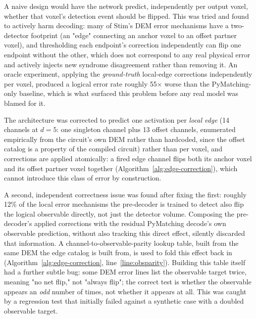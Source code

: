 \documentclass[conference]{IEEEtran}
\begin{document}
A naive design would have the network predict, independently per output voxel, whether that voxel's detection event should be flipped. This was tried and found to actively harm decoding: many of Stim's DEM error mechanisms have a two-detector footprint (an "edge" connecting an anchor voxel to an offset partner voxel), and thresholding each endpoint's correction independently can flip one endpoint without the other, which does not correspond to any real physical error and actively injects new syndrome disagreement rather than removing it. An oracle experiment, applying the \emph{ground-truth} local-edge corrections independently per voxel, produced a logical error rate roughly 55\(\times\) worse than the PyMatching-only baseline, which is what surfaced this problem before any real model was blamed for it.

The architecture was corrected to predict one activation per \emph{local edge} (14 channels at \(d=5\): one singleton channel plus 13 offset channels, enumerated empirically from the circuit's own DEM rather than hardcoded, since the offset catalog is a property of the compiled circuit) rather than per voxel, and corrections are applied atomically: a fired edge channel flips both its anchor voxel and its offset partner voxel together (Algorithm~\ref{alg:edge-correction}), which cannot introduce this class of error by construction.

A second, independent correctness issue was found after fixing the first: roughly 12\% of the local error mechanisms the pre-decoder is trained to detect also flip the logical observable directly, not just the detector volume. Composing the pre-decoder's applied corrections with the residual PyMatching decode's own observable prediction, without also tracking this direct effect, silently discarded that information. A channel-to-observable-parity lookup table, built from the same DEM the edge catalog is built from, is used to fold this effect back in (Algorithm~\ref{alg:edge-correction}, line~\ref{line:obsparity}). Building this table itself had a further subtle bug: some DEM error lines list the observable target twice, meaning "no net flip," not "always flip"; the correct test is whether the observable appears an \emph{odd} number of times, not whether it appears at all. This was caught by a regression test that initially failed against a synthetic case with a doubled observable target.
\end{document}
